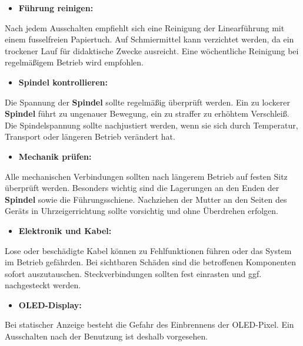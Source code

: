 \documentclass[a4paper,12pt]{report}
\begin{document}
\begin{itemize}[leftmargin=1.5em]
	\item \textbf{Führung reinigen:} 
\end{itemize}
Nach jedem Ausschalten empfiehlt sich eine Reinigung der Linearführung mit einem fusselfreien Papiertuch. Auf Schmiermittel kann verzichtet werden, da ein trockener Lauf für didaktische Zwecke ausreicht. Eine wöchentliche Reinigung bei regelmäßigem Betrieb wird empfohlen.

\begin{itemize}[leftmargin=1.5em]		
	\item \textbf{Spindel kontrollieren:} 
\end{itemize}
Die Spannung der \textbf{Spindel} sollte regelmäßig überprüft werden. Ein zu lockerer \textbf{Spindel} führt zu ungenauer Bewegung, ein zu straffer zu erhöhtem Verschleiß. Die Spindelspannung sollte nachjustiert werden, wenn sie sich durch Temperatur, Transport oder längeren Betrieb verändert hat. 

\begin{itemize}[leftmargin=1.5em]		
	\item \textbf{Mechanik prüfen:}  
\end{itemize}
Alle mechanischen Verbindungen sollten nach längerem Betrieb auf festen Sitz überprüft werden. Besonders wichtig sind die Lagerungen an den Enden der \textbf{Spindel} sowie die Führungsschiene. Nachziehen der Mutter an den Seiten des Geräts in Uhrzeigerrichtung sollte vorsichtig und ohne Überdrehen erfolgen.

\begin{itemize}[leftmargin=1.5em]		
	\item \textbf{Elektronik und Kabel:}  
\end{itemize}
Lose oder beschädigte Kabel können zu Fehlfunktionen führen oder das System im Betrieb gefährden. Bei sichtbaren Schäden sind die betroffenen Komponenten sofort auszutauschen. Steckverbindungen sollten fest einrasten und ggf. nachgesteckt werden.

\begin{itemize}[leftmargin=1.5em]		
	\item \textbf{OLED-Display:}  
\end{itemize}
Bei statischer Anzeige besteht die Gefahr des Einbrennens der OLED-Pixel. Ein Ausschalten nach der Benutzung ist deshalb vorgesehen.

\setlength{\leftskip}{0pt} %
\end{document}
